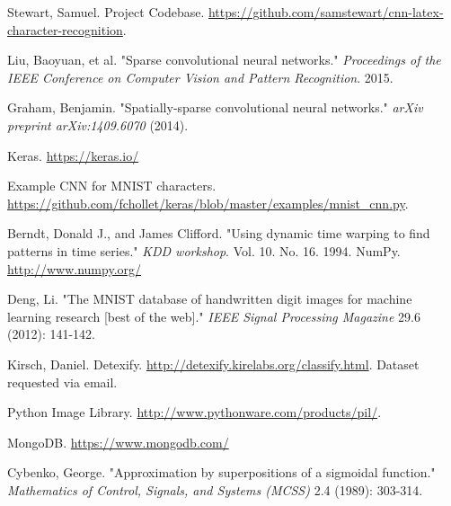 Stewart, Samuel. Project Codebase. \url{https://github.com/samstewart/cnn-latex-character-recognition}. 

Liu, Baoyuan, et al. "Sparse convolutional neural networks." \textit{Proceedings of the IEEE Conference on Computer Vision and Pattern Recognition}. 2015.

Graham, Benjamin. "Spatially-sparse convolutional neural networks." \textit{arXiv preprint arXiv:1409.6070} (2014).

Keras. \url{https://keras.io/}

Example CNN for MNIST characters. \url{https://github.com/fchollet/keras/blob/master/examples/mnist_cnn.py}.

Berndt, Donald J., and James Clifford. "Using dynamic time warping to find patterns in time series." \textit{KDD workshop}. Vol. 10. No. 16. 1994.
NumPy. \url{http://www.numpy.org/}

Deng, Li. "The MNIST database of handwritten digit images for machine learning research [best of the web]." \textit{IEEE Signal Processing Magazine} 29.6 (2012): 141-142.

Kirsch, Daniel. Detexify. \url{http://detexify.kirelabs.org/classify.html}. Dataset requested via email.

Python Image Library. \url{http://www.pythonware.com/products/pil/}.

MongoDB. \url{https://www.mongodb.com/}

Cybenko, George. "Approximation by superpositions of a sigmoidal function." \textit{Mathematics of Control, Signals, and Systems (MCSS)} 2.4 (1989): 303-314.
